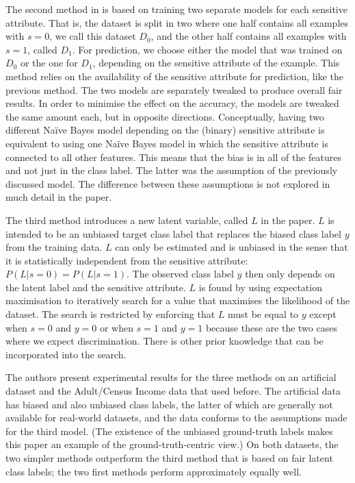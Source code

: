 The second method in \citet{calders2010three} is based on training two separate models for each
sensitive attribute. That is, the dataset is split in two where one half contains all examples with
\(s=0\), we call this dataset \(D_0\), and the other half contains all examples with \(s=1\),
called \(D_1\). For prediction, we choose either the model that was trained on \(D_0\) or the one
for \(D_1\), depending on the sensitive attribute of the example. This method relies on the
availability of the sensitive attribute for prediction, like the previous method. The two models
are separately tweaked to produce overall fair results. In order to minimise the effect on the
accuracy, the models are tweaked the same amount each, but in opposite directions. Conceptually,
having two different Na\"ive Bayes model depending on the (binary) sensitive attribute is
equivalent to using one Na\"ive Bayes model in which the sensitive attribute is connected to all
other features. This means that the bias is in all of the features and not just in the class label.
The latter was the assumption of the previously discussed model. The difference between these
assumptions is not explored in much detail in the paper.

The third method introduces a new latent variable, called \(L\) in the paper. \(L\) is intended to
be an unbiased target class label that replaces the biased class label \(y\) from the training
data. \(L\) can only be estimated and is unbiased in the sense that it is statistically independent
from the sensitive attribute: \(P(L|s=0) = P(L|s=1)\). The observed class label \(y\) then only
depends on the latent label and the sensitive attribute. \(L\) is found by using expectation
maximisation to iteratively search for a value that maximises the likelihood of the dataset. The
search is restricted by enforcing that \(L\) must be equal to \(y\) except when \(s=0\) and \(y=0\)
or when \(s=1\) and \(y=1\) because these are the two cases where we expect discrimination. There
is other prior knowledge that can be incorporated into the search.

The authors present experimental results for the three methods on an artificial dataset and the
Adult/Census Income data that \citet{calders2009building} used before. The artificial data has
biased and also unbiased class labels, the latter of which are generally not available for
real-world datasets, and the data conforms to the assumptions made for the third model. (The
existence of the unbiased ground-truth labels makes this paper an example of the
ground-truth-centric view.)
On both datasets, the two simpler methods outperform the third method that is based on fair latent
class labels; the two first methods perform approximately equally well.

